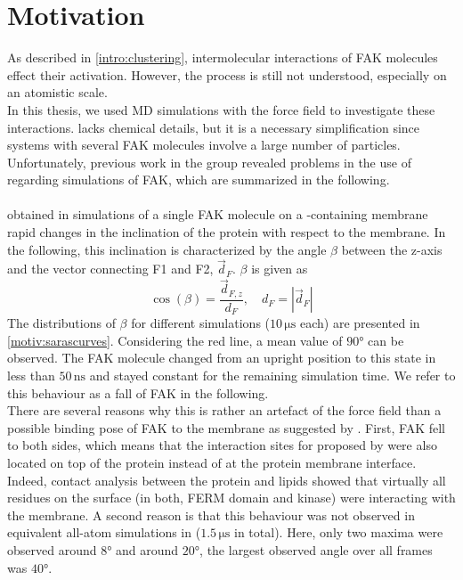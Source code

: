 \chapter{Motivation}
\label{motivation}
As described in \autoref{intro:clustering}, intermolecular interactions of FAK molecules effect their activation. However, the process is still not understood, especially on an atomistic scale.\\
In this thesis, we used MD simulations with the \martini{} force field to investigate these interactions. \martini{} lacks chemical details, but it is a necessary simplification since systems with several FAK molecules involve a large number of particles. Unfortunately, previous work in the group \autocite{sara} revealed problems in the use of \martini{} regarding simulations of FAK, which are summarized in the following.\\
\\
\textcite{sara} obtained in simulations of a single FAK molecule on a \pip{}-containing membrane rapid changes in the inclination of the protein with respect to the membrane. In the following, this inclination is characterized by the angle $\beta$ between the z-axis and the vector connecting F1 and F2, $\vec{d}_F$. $\beta$ is given as
\begin{equation}
\cos\left(\beta\right) = \frac{\vec{d}_{F, z}}{d_F},\quad d_F = \left|\vec{d}_F\right|
\end{equation}
The distributions of $\beta$ for different simulations ($10\,\si{\micro\second}$ each) are presented in \autoref{motiv:sarascurves}. Considering the red line, a mean value of $90°$ can be observed. The FAK molecule changed from an upright position to this state in less than $50\,\si{\nano\second}$ and stayed constant for the remaining simulation time. We refer to this behaviour as a fall of FAK in the following.\\
There are several reasons why this is rather an artefact of the \martini{} force field than a possible binding pose of FAK to the membrane as suggested by \textcite{pap002}. First, FAK fell to both sides, which means that the interaction sites for \pip{} proposed by \textcite{pap002} were also located on top of the protein instead of at the protein membrane interface. Indeed, contact analysis between the protein and \pip{} lipids showed that virtually all residues on the surface (in both, FERM domain and kinase) were interacting with the membrane. A second reason is that this behaviour was not observed in equivalent all-atom simulations in \charmm{} ($1.5\,\si{\micro\second}$ in total). Here, only two maxima were observed around $8°$ and around $20°$, the largest observed angle over all frames was $40°$.\\
